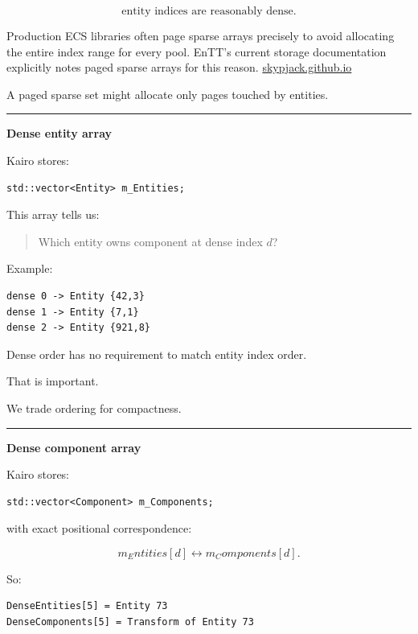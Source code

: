 \[
\text{entity indices are reasonably dense}.
\]

Production ECS libraries often page sparse arrays precisely to avoid allocating the entire index range for every pool. EnTT's current storage documentation explicitly notes paged sparse arrays for this reason. \href{https://skypjack.github.io/entt/md_docs_2md_2entity.html?utm_source=chatgpt.com}{skypjack.github.io}

A paged sparse set might allocate only pages touched by entities.

\begin{center}\rule{0.5\linewidth}{0.5pt}\end{center}

\textbf{Dense entity array}

Kairo stores:

\begin{verbatim}
std::vector<Entity> m_Entities;
\end{verbatim}

This array tells us:

\begin{quote}
Which entity owns component at dense index \(d\)?
\end{quote}

Example:

\begin{verbatim}
dense 0 -> Entity {42,3}
dense 1 -> Entity {7,1}
dense 2 -> Entity {921,8}
\end{verbatim}

Dense order has no requirement to match entity index order.

That is important.

We trade ordering for compactness.

\begin{center}\rule{0.5\linewidth}{0.5pt}\end{center}

\textbf{Dense component array}

Kairo stores:

\begin{verbatim}
std::vector<Component> m_Components;
\end{verbatim}

with exact positional correspondence:

\[
m_Entities[d]
\leftrightarrow
m_Components[d].
\]

So:

\begin{verbatim}
DenseEntities[5] = Entity 73
DenseComponents[5] = Transform of Entity 73
\end{verbatim}

